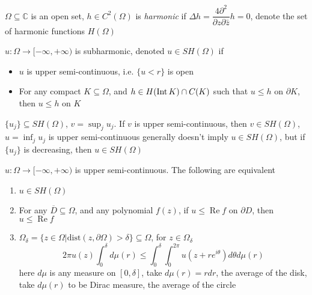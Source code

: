 \documentclass[../main.tex]{subfiles}
\begin{document}
\begin{definition}
$\Omega\subseteq\mathbb C$ is an open set, $h\in C^2(\Omega)$ is \textit{harmonic} if $\Delta h=\dfrac{4\partial^2}{\partial z\partial\bar z}h=0$, denote the set of harmonic functions $H(\Omega)$
\end{definition}

\begin{definition}
$u:\Omega\to[-\infty,+\infty)$ is subharmonic, denoted $u\in SH(\Omega)$ if
\begin{itemize}
\item $u$ is upper semi-continuous, i.e. $\{u<r\}$ is open
\item For any compact $K\subseteq\Omega$, and $h\in H(\operatorname{Int} K)\cap C(K)$ such that $u\leq h$ on $\partial K$, then $u\leq h$ on $K$
\end{itemize}
\end{definition}

\begin{theorem}
$\{u_j\}\subseteq SH(\Omega)$, $v=\displaystyle\sup_{j} u_j$. If $v$ is upper semi-continuous, then $v\in SH(\Omega)$, $u=\displaystyle\inf_{j}u_j$ is upper semi-continuous generally doesn't imply $u\in SH(\Omega)$, but if $\{u_j\}$ is decreasing, then $u\in SH(\Omega)$
\end{theorem}

\begin{theorem}
$u:\Omega\to[-\infty,+\infty)$ is upper semi-continuous. The following are equivalent
\begin{enumerate}
\item $u\in SH(\Omega)$
\item For any $\overline D\subseteq\Omega$, and any polynomial $f(z)$, if $u\leq \operatorname{Re}f$ on $\partial D$, then $u\leq\operatorname{Re}f$
\item $\Omega_\delta=\{z\in\Omega|\mathrm{dist}(z,\partial\Omega)>\delta\}\subseteq\Omega$, for $z\in\Omega_\delta$ \[2\pi u(z)\int_0^\delta d\mu(r)\leq\int_0^\delta\int_0^{2\pi}u(z+re^{i\theta})d\theta d\mu(r)\] here $d\mu$ is any measure on $[0,\delta]$, take $d\mu(r)=rdr$, the average of the disk, take $d\mu(r)$ to be Dirac measure, the average of the circle
\end{enumerate}

\end{theorem}
\end{document}
